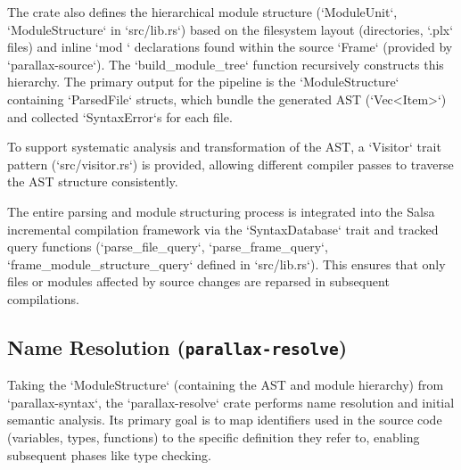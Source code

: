 The crate also defines the hierarchical module structure (`ModuleUnit`, `ModuleStructure` in `src/lib.rs`) based on the filesystem layout (directories, `.plx` files) and inline `mod {}` declarations found within the source `Frame` (provided by `parallax-source`). The `build_module_tree` function recursively constructs this hierarchy. The primary output for the pipeline is the `ModuleStructure` containing `ParsedFile` structs, which bundle the generated AST (`Vec<Item>`) and collected `SyntaxError`s for each file.

To support systematic analysis and transformation of the AST, a `Visitor` trait pattern (`src/visitor.rs`) is provided, allowing different compiler passes to traverse the AST structure consistently.

The entire parsing and module structuring process is integrated into the Salsa incremental compilation framework via the `SyntaxDatabase` trait and tracked query functions (`parse_file_query`, `parse_frame_query`, `frame_module_structure_query` defined in `src/lib.rs`). This ensures that only files or modules affected by source changes are reparsed in subsequent compilations.

\subsection{Name Resolution (\texttt{parallax-resolve})} %
Taking the `ModuleStructure` (containing the AST and module hierarchy) from `parallax-syntax`, the `parallax-resolve` crate performs name resolution and initial semantic analysis. Its primary goal is to map identifiers used in the source code (variables, types, functions) to the specific definition they refer to, enabling subsequent phases like type checking.

